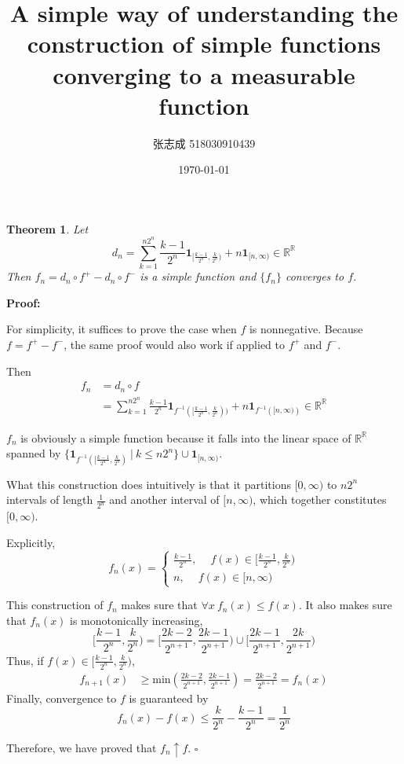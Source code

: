 \documentclass[UTF8, 12pt]{article}
\title{A simple way of understanding the construction of simple functions converging to a measurable function}
\author{张志成 518030910439}
\date{\today}
\newenvironment{proof}{\noindent\ignorespaces\textbf{Proof:}}{\hfill $\square$\par\noindent}
\newtheorem*{theorem*}{Theorem}
\begin{document}
    \maketitle
    \begin{theorem*}
        Let $$ d_n = \sum_{k=1}^{n2^n} \frac{k-1}{2^n}\textbf{1}_{[\frac{k-1}{2^n}, \frac{k}{2^n})} + n\textbf{1}_{[n,\infty)} \in \mathbb{R}^\mathbb{R} $$
        Then $f_n = d_n \circ f^+ - d_n \circ f^-$ is a simple function and $\{f_n\}$ converges to $f$.
    \end{theorem*}

    \begin{proof}

        For simplicity, it suffices to prove the case when $f$ is nonnegative. Because $f = f^+ - f^-$, the same proof would also work if applied to $f^+$ and $f^-$.
        
        Then
        \begin{align*} 
            f_n &= d_n \circ f \\
            & = \sum_{k=1}^{n2^n} \frac{k-1}{2^n}\textbf{1}_{f^{-1}([\frac{k-1}{2^n}, \frac{k}{2^n}))} + n\textbf{1}_{f^{-1}({[n,\infty)})} \in \mathbb{R}^\mathbb{R}
        \end{align*}

        $f_n$ is obviously a simple function because it falls into the linear space of $\mathbb{R}^\mathbb{R}$ spanned by $\{\textbf{1}_{f^{-1}([\frac{k-1}{2^n}, \frac{k}{2^n})}\ |\ k \leq n2^n\}  \cup \textbf{1}_{[n,\infty)} $. 

        What this construction does intuitively is that it partitions $[0, \infty)$ to $n2^n$ intervals of length $\frac{1}{2^n}$ and another interval of $[n,\infty)$, which together constitutes $[0, \infty)$. 

        Explicitly, 
        \[
        f_n(x) =  
            \begin{cases}
                \frac{k-1}{2^n}, \quad \ f(x) \in [\frac{k-1}{2^n}, \frac{k}{2^n}) \\
                n, \quad \  f(x) \in [n, \infty)
            \end{cases}
        \]

        This construction of $f_n$ makes sure that $\forall x\ f_n(x) \leq f(x)$.
        It also makes sure that $f_n(x)$ is monotonically increasing, 
        $$
        [\frac{k-1}{2^n}, \frac{k}{2^n}) = [\frac{2k-2}{2^{n+1}}, \frac{2k-1}{2^{n+1}}) \cup [\frac{2k-1}{2^{n+1}}, \frac{2k}{2^{n+1}})
        $$
        Thus, if $f(x) \in [\frac{k-1}{2^n}, \frac{k}{2^n})$, 
        \begin{align*}
            f_{n+1}(x) &\geq \text{min}(\frac{2k-2}{2^{n+1}}, \frac{2k-1}{2^{n+1}}) = \frac{2k-2}{2^{n+1}} = f_n(x)
        \end{align*}
        Finally, convergence to $f$ is guaranteed by $$ f_n(x) - f(x) \leq \frac{k}{2^n} - \frac{k-1}{2^n} = \frac{1}{2^n} $$
    
        Therefore, we have proved that $f_n \uparrow f$. 
    \end{proof}
\end{document}
